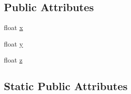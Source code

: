 \subsection*{Public Attributes}
\begin{DoxyCompactItemize}
\item 
float \mbox{\hyperlink{struct_leap_1_1_vector_aa567a19970c776ccb9ebe9a09cb14828}{x}}
\item 
float \mbox{\hyperlink{struct_leap_1_1_vector_a458897a143435a1292796d8dfb1d760d}{y}}
\item 
float \mbox{\hyperlink{struct_leap_1_1_vector_afd2f32c0771e6e15fcef62f0fbf57658}{z}}
\end{DoxyCompactItemize}
\subsection*{Static Public Attributes}
